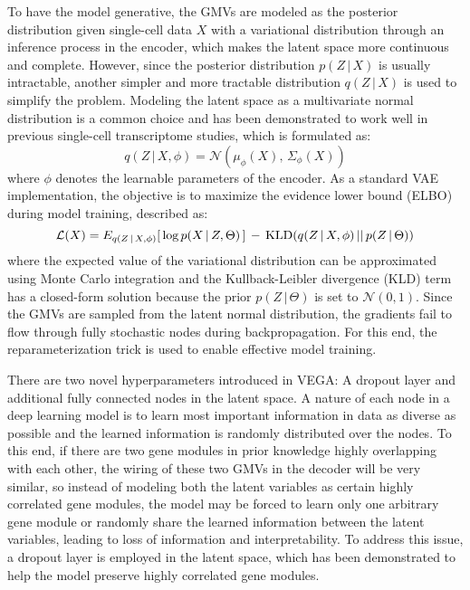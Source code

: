 To have the model generative, the GMVs are modeled as the posterior distribution given single-cell data $X$ with a variational distribution through an inference process in the encoder, which makes the latent space more continuous and complete\cite{Rocca2019}. However, since the posterior distribution $p(Z\,|\,X)$ is usually intractable, another simpler and more tractable distribution $q(Z\,|\,X)$ is used to simplify the problem. Modeling the latent space as a multivariate normal distribution is a common choice and has been demonstrated to work well in previous single-cell transcriptome studies\cite{Seninge2021,Lopez2018,Lotfollahi2019}, which is formulated as:
\begin{equation}
    q(Z\,|\,X,\phi) = \mathcal{N}(\mu_\phi(X),\,\Sigma_\phi(X))
\end{equation}
where $\phi$ denotes the learnable parameters of the encoder. As a standard VAE implementation\cite{Kingma2014}, the objective is to maximize the evidence lower bound (ELBO) during model training, described as:
\begin{equation}
    \mathcal{L}(X) = E_{q(Z\,|\,X,\phi)}[\,\textnormal{log}\,p(X\,|\,Z,\Theta)\,]\,-\,\textnormal{KLD}(q(Z\,|\,X,\phi)\,||\,p(Z\,|\,\Theta))
\end{equation}
where the expected value of the variational distribution can be approximated using Monte Carlo integration\cite{Cumer2020} and the Kullback-Leibler divergence\cite{Joyce2011} (KLD) term has a closed-form solution because the prior $p(Z\,|\,\Theta)$ is set to $\mathcal{N}(0,1)$. Since the GMVs are sampled from the latent normal distribution, the gradients fail to flow through fully stochastic nodes during backpropagation\cite{Insights2018}. For this end, the reparameterization trick\cite{Kingma2014} is used to enable effective model training.

There are two novel hyperparameters introduced in VEGA: A dropout layer and additional fully connected nodes in the latent space. A nature of each node in a deep learning model is to learn most important information in data as diverse as possible and the learned information is randomly distributed over the nodes. To this end, if there are two gene modules in prior knowledge highly overlapping with each other, the wiring of these two GMVs in the decoder will be very similar, so instead of modeling both the latent variables as certain highly correlated gene modules, the model may be forced to learn only one arbitrary gene module or randomly share the learned information between the latent variables, leading to loss of information and interpretability. To address this issue, a dropout layer is employed in the latent space, which has been demonstrated to help the model preserve highly correlated gene modules\cite{Seninge2021}.


